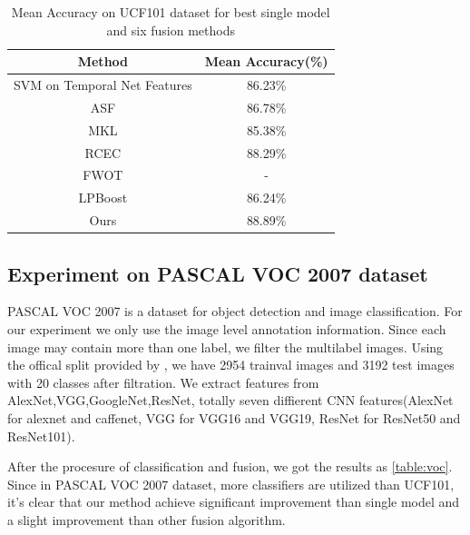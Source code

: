 \documentclass[letterpaper]{article}
\begin{document}
\begin{table}[h]\small
\centering
\label{table:ucf101}
\begin{tabular}{c|c}
\hline
Method                       & Mean Accuracy(\%) \\\hline
SVM on Temporal Net Features & 86.23\%            \\\hline
ASF                          & 86.78\%           \\
MKL                          & 85.38\%           \\
RCEC                         & 88.29\%           \\
FWOT                         & -                 \\
LPBoost                      & 86.24\%           \\\hline
Ours                         & 88.89\%           \\
\hline
\end{tabular}
\caption{Mean Accuracy on UCF101 dataset for best single model and six fusion methods}
\end{table}



\iffalse
\subsection{Experiment on PASCAL VOC 2007 dataset}
PASCAL VOC 2007 is a dataset for object detection and image classification. For our experiment we only use the image level annotation information. Since each image may contain more than one label, we filter the multilabel images. Using the offical split provided by \cite{pascal-voc-2007}, we have 2954 trainval images and 3192 test images with 20 classes after filtration. We extract features from AlexNet,VGG,GoogleNet,ResNet, totally seven diffierent CNN features(AlexNet for alexnet and caffenet, VGG for VGG16 and VGG19, ResNet for ResNet50 and ResNet101).

After the procesure of classification and fusion, we got the results as \ref{table:voc}. Since in PASCAL VOC 2007 dataset, more classifiers are utilized than UCF101, it's clear that our method achieve significant improvement than single model and a slight improvement than other fusion algorithm.
\end{document}

